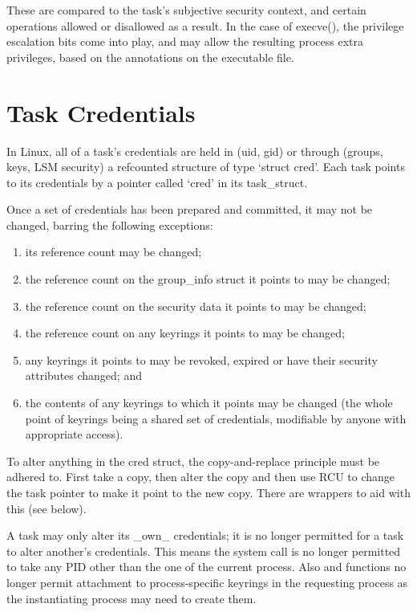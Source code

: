 \documentclass[a4paper,8pt,english]{sphinxmanual}
\begin{document}
These are compared to the task's subjective security context, and certain
operations allowed or disallowed as a result.  In the case of execve(), the
privilege escalation bits come into play, and may allow the resulting process
extra privileges, based on the annotations on the executable file.


\section{Task Credentials}
\label{security/credentials:task-credentials}
In Linux, all of a task's credentials are held in (uid, gid) or through
(groups, keys, LSM security) a refcounted structure of type `struct cred'.
Each task points to its credentials by a pointer called `cred' in its
task\_struct.

Once a set of credentials has been prepared and committed, it may not be
changed, barring the following exceptions:
\begin{enumerate}
\item {} 
its reference count may be changed;

\item {} 
the reference count on the group\_info struct it points to may be changed;

\item {} 
the reference count on the security data it points to may be changed;

\item {} 
the reference count on any keyrings it points to may be changed;

\item {} 
any keyrings it points to may be revoked, expired or have their security
attributes changed; and

\item {} 
the contents of any keyrings to which it points may be changed (the whole
point of keyrings being a shared set of credentials, modifiable by anyone
with appropriate access).

\end{enumerate}

To alter anything in the cred struct, the copy-and-replace principle must be
adhered to.  First take a copy, then alter the copy and then use RCU to change
the task pointer to make it point to the new copy.  There are wrappers to aid
with this (see below).

A task may only alter its \_own\_ credentials; it is no longer permitted for a
task to alter another's credentials.  This means the  system call
is no longer permitted to take any PID other than the one of the current
process. Also  and  functions no
longer permit attachment to process-specific keyrings in the requesting
process as the instantiating process may need to create them.
\end{document}
